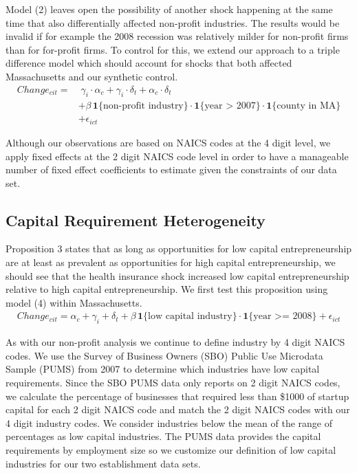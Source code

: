 \documentclass[12pt]{article}
\begin{document}
Model (2) leaves open the possibility of another shock happening at the same time that also differentially affected non-profit industries. The results would be invalid if for example the 2008 recession was relatively milder for non-profit firms than for for-profit firms. To control for this, we extend our approach to a triple difference model which should account for shocks that both affected Massachusetts and our synthetic control. 
\begin{align}
Change_{cit} = & \; \gamma_i \cdot \alpha_c + \gamma_i \cdot \delta_t +  \alpha_c \cdot \delta_t \nonumber   \\
& + \beta \, \mathbf{1}\{\text{non-profit industry}\} \cdot \mathbf{1}\{\text{year > 2007}\}  \cdot \mathbf{1}\{\text{county in  MA}\} \nonumber  \\
& + \epsilon_{ict}
\end{align}

Although our observations are based on NAICS codes at the 4 digit level, we apply fixed effects at the 2 digit NAICS code level in order to have a manageable number of fixed effect coefficients to estimate given the constraints of our data set. 

\subsection{Capital Requirement Heterogeneity}

Proposition 3 states that as long as opportunities for low capital entrepreneurship are at least as prevalent as opportunities for high capital entrepreneurship, we should see that the health insurance shock increased low capital entrepreneurship relative to high capital entrepreneurship. We first test this proposition using model (4) within Massachusetts. 
\begin{align}
Change_{cit} =  \alpha_c + \gamma_i+ \delta_t + \beta \, \mathbf{1}\{\text{low capital industry}\} \cdot \mathbf{1}\{\text{year >= 2008}\} + \epsilon_{ict}
\end{align}

As with our non-profit analysis we continue to define industry by 4 digit NAICS codes. We use the Survey of Business Owners (SBO) Public Use Microdata Sample (PUMS) from 2007 to determine which industries have low capital requirements. Since the SBO PUMS data only reports on 2 digit NAICS codes, we calculate the percentage of businesses that required less than \$1000 of startup capital for each 2 digit NAICS code and match the 2 digit NAICS codes with our 4 digit industry codes. We consider industries below the mean of the range of percentages as low capital industries. The PUMS data provides the capital requirements by employment size so we customize our definition of low capital industries for our two establishment data sets. 
\end{document}
